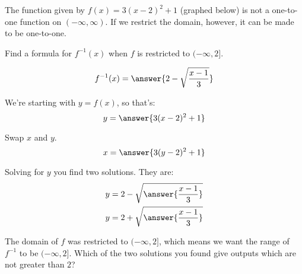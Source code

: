 \documentclass{ximera}
\author{Bobby Ramsey}
\begin{document}
\begin{exercise}




The function given by $f(x)=3(x-2)^2+1$ (graphed below) is not a one-to-one function on $(-\infty, \infty)$.  If we restrict the domain, however,
it can be made to be one-to-one.

\begin{image}
\end{image}

Find a formula for $f^{-1}(x)$ when $f$ is restricted to $(-\infty, 2]$.


\[ f^{-1}(x) = \answer{2-\sqrt{\frac{x-1}{3}}}\]
\begin{hint}
	We're starting with $y = f(x)$, so that's:
	\[ y = \answer{3(x-2)^2+1} \]
	
	Swap $x$ and $y$.
	\[ x = \answer{3(y-2)^2+1} \]
	
	Solving for $y$ you find two solutions.  They are:
	\begin{align*}
		y &= 2-\sqrt{\answer{\frac{x-1}{3}}} \\
		y &= 2+\sqrt{\answer{\frac{x-1}{3}}}
	\end{align*}
	
	The domain of $f$ was restricted to $(-\infty, 2]$, which means we want the range of $f^{-1}$ to be $(-\infty, 2]$.
	Which of the two solutions you found give outputs which are not greater than $2$?
\end{hint}


\end{exercise}
\end{document}
